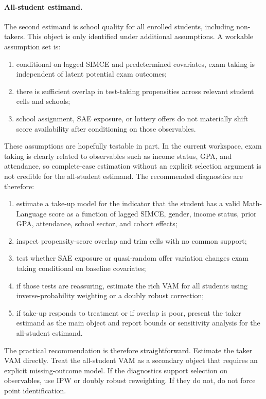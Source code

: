 \documentclass[11pt]{article}
\begin{document}
\paragraph{All-student estimand.}
The second estimand is school quality for all enrolled students, including non-takers. This object is only identified under additional assumptions. A workable assumption set is:
\begin{enumerate}
    \item conditional on lagged SIMCE and predetermined covariates, exam taking is independent of latent potential exam outcomes;
    \item there is sufficient overlap in test-taking propensities across relevant student cells and schools;
    \item school assignment, SAE exposure, or lottery offers do not materially shift score availability after conditioning on those observables.
\end{enumerate}

These assumptions are hopefully testable in part. In the current workspace, exam taking is clearly related to observables such as income status, GPA, and attendance, so complete-case estimation without an explicit selection argument is not credible for the all-student estimand. The recommended diagnostics are therefore:
\begin{enumerate}
    \item estimate a take-up model for the indicator that the student has a valid Math-Language score as a function of lagged SIMCE, gender, income status, prior GPA, attendance, school sector, and cohort effects;
    \item inspect propensity-score overlap and trim cells with no common support;
    \item test whether SAE exposure or quasi-random offer variation changes exam taking conditional on baseline covariates;
    \item if those tests are reassuring, estimate the rich VAM for all students using inverse-probability weighting or a doubly robust correction;
    \item if take-up responds to treatment or if overlap is poor, present the taker estimand as the main object and report bounds or sensitivity analysis for the all-student estimand.
\end{enumerate}

The practical recommendation is therefore straightforward. Estimate the taker VAM directly. Treat the all-student VAM as a secondary object that requires an explicit missing-outcome model. If the diagnostics support selection on observables, use IPW or doubly robust reweighting. If they do not, do not force point identification.
\end{document}
